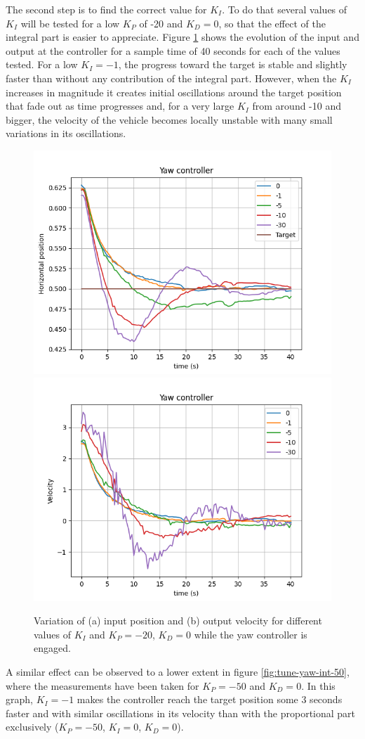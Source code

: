 The second step is to find the correct value for $K_I$. To do that several values of $K_I$ will be tested for a low $K_P$ of -20 and $K_D=0$, so that the effect of the integral part is easier to appreciate. Figure \ref{fig:tune-yaw-int-20} shows the evolution of the input and output at the controller for a sample time of 40 seconds for each of the values tested. 
For a low $K_I=-1$, the progress toward the target is stable and slightly faster than without any contribution of the integral part.
However, when the $K_I$ increases in magnitude it creates initial oscillations around the target position that fade out as time progresses and, for a very large $K_I$ from around -10 and bigger, the velocity of the vehicle becomes locally unstable with many small variations in its oscillations.

\begin{figure}
  \centering
  \includegraphics[width=.45\linewidth]{img/pid/yaw/yaw_pos_p20_int_d0.png}
  \includegraphics[width=.45\linewidth]{img/pid/yaw/yaw_vel_p20_int_d0.png}
  \caption{Variation of (a) input position and (b) output velocity for different values of $K_{I}$ and $K_P=-20$, $K_D=0$ while the yaw controller is engaged.}\label{fig:tune-yaw-int-20}
\end{figure}

A similar effect can be observed to a lower extent in figure \ref{fig:tune-yaw-int-50}, where the measurements have been taken for $K_P=-50$ and $K_D=0$. 
In this graph, $K_I=-1$ makes the controller reach the target position some 3 seconds faster and with similar oscillations in its velocity than with the proportional part exclusively ($K_P=-50$, $K_I=0$, $K_D=0$).

